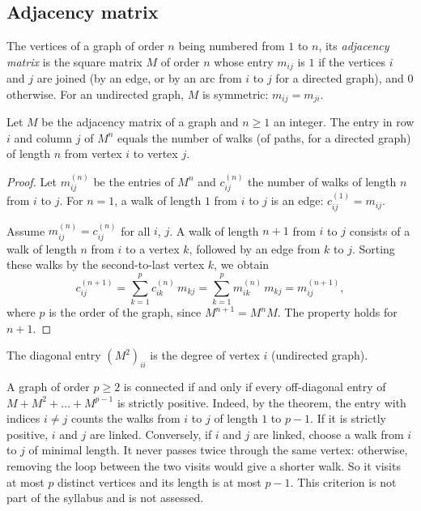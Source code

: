 \subsection{Adjacency matrix}
\begin{definition}
The vertices of a graph of order $n$ being numbered from $1$ to $n$, its \emph{adjacency matrix} is the square matrix $M$ of order $n$ whose entry $m_{ij}$ is $1$ if the vertices $i$ and $j$ are joined (by an edge, or by an arc from $i$ to $j$ for a directed graph), and $0$ otherwise. For an undirected graph, $M$ is symmetric: $m_{ij}=m_{ji}$.
\end{definition}
\begin{theorem}
Let $M$ be the adjacency matrix of a graph and $n\ge1$ an integer. The entry in row $i$ and column $j$ of $M^n$ equals the number of walks (of paths, for a directed graph) of length $n$ from vertex $i$ to vertex $j$.
\end{theorem}
\begin{proof}
Let $m^{(n)}_{ij}$ be the entries of $M^n$ and $c^{(n)}_{ij}$ the number of walks of length $n$ from $i$ to $j$. For $n=1$, a walk of length $1$ from $i$ to $j$ is an edge: $c^{(1)}_{ij}=m_{ij}$.\par
Assume $m^{(n)}_{ij}=c^{(n)}_{ij}$ for all $i$, $j$. A walk of length $n+1$ from $i$ to $j$ consists of a walk of length $n$ from $i$ to a vertex $k$, followed by an edge from $k$ to $j$. Sorting these walks by the second-to-last vertex $k$, we obtain
\[c^{(n+1)}_{ij}=\sum_{k=1}^{p}c^{(n)}_{ik}\,m_{kj}=\sum_{k=1}^{p}m^{(n)}_{ik}\,m_{kj}=m^{(n+1)}_{ij},\]
where $p$ is the order of the graph, since $M^{n+1}=M^nM$. The property holds for $n+1$.
\end{proof}
\begin{keypoint}[Consequences]
The diagonal entry $\left(M^2\right)_{ii}$ is the degree of vertex $i$ (undirected graph).
\end{keypoint}
\begin{beyond}A graph of order $p\ge2$ is connected if and only if every off-diagonal entry of $M+M^2+\dots+M^{p-1}$ is strictly positive. Indeed, by the theorem, the entry with indices $i\neq j$ counts the walks from $i$ to $j$ of length $1$ to $p-1$. If it is strictly positive, $i$ and $j$ are linked. Conversely, if $i$ and $j$ are linked, choose a walk from $i$ to $j$ of minimal length. It never passes twice through the same vertex: otherwise, removing the loop between the two visits would give a shorter walk. So it visits at most $p$ distinct vertices and its length is at most $p-1$. This criterion is not part of the syllabus and is not assessed.\end{beyond}

